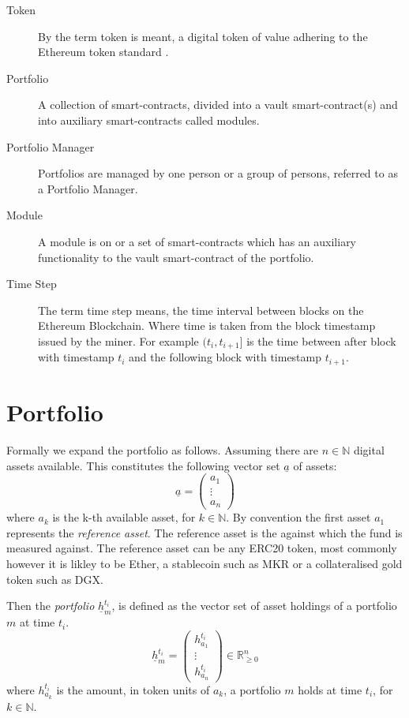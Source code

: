 \documentclass[9pt,oneside]{amsart}
\theoremstyle{plain}
\begin{document}
\begin{description}
\item[Token] By the term token is meant, a digital token of value adhering to the Ethereum token standard \cite{tokenstandard}.
\item[Portfolio] A collection of smart-contracts, divided into a vault smart-contract(s) and into auxiliary smart-contracts called modules.
\item[Portfolio Manager] Portfolios are managed by one person or a group of persons, referred to as a Portfolio Manager.
\item[Module] A module is on or a set of smart-contracts which has an auxiliary functionality to the vault smart-contract of the portfolio.
\item[Time Step] The term time step means, the time interval between blocks on the Ethereum Blockchain. Where time is taken from the block timestamp issued by the miner. For example $(t_i, t_{i+1}]$ is the time between after block with timestamp $t_i$ and the following block with timestamp $t_{i+1}$.
	
\end{description}

\section{Portfolio}\label{app:defportfolio}

Formally we expand the portfolio as follows. Assuming there are $n \in \mathbb{N}$ digital assets available. This constitutes the following vector set $\underline{a}$ of assets:
\begin{equation}
	\underline{a} = \begin{pmatrix}a_{1}\\ \vdots \\ a_{n}\end{pmatrix}
\end{equation}
where $a_k$ is the k-th available asset, for $k \in \mathbb{N}$.
By convention the first asset $a_1$ represents the \textit{reference asset}.
The reference asset is the against which the fund is measured against. The reference asset can be any ERC20 token, most commonly however it is likley to be Ether, a stablecoin such as MKR\cite{makerdao} or a collateralised gold token such as DGX\cite{digix}.

Then the \textit{portfolio} $\underline{h}_m^{t_i}$, is defined as the vector set of asset holdings of a portfolio $m$ at time $t_i$.
\begin{equation}
	\underline{h}_m^{t_i} = \begin{pmatrix}h_{a_{1}}^{t_i}\\ \vdots \\ h_{a_{n}}^{t_i}\end{pmatrix} \in \mathbb{R}_{\geq 0}^n
\end{equation}
where $h_{a_{k}}^{t_i}$ is the amount, in token units of $a_k$, a portfolio $m$ holds at time $t_i$, for $k \in \mathbb{N}$.
\end{document}
